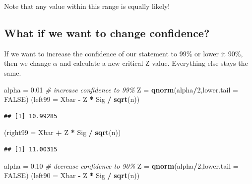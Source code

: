 \documentclass[
]{book}
\newenvironment{Shaded}{\begin{snugshade}}{\end{snugshade}}
\newcommand{\AttributeTok}[1]{\textcolor[rgb]{0.13,0.29,0.53}{#1}}
\newcommand{\CommentTok}[1]{\textcolor[rgb]{0.56,0.35,0.01}{\textit{#1}}}
\newcommand{\ConstantTok}[1]{\textcolor[rgb]{0.56,0.35,0.01}{#1}}
\newcommand{\DecValTok}[1]{\textcolor[rgb]{0.00,0.00,0.81}{#1}}
\newcommand{\FloatTok}[1]{\textcolor[rgb]{0.00,0.00,0.81}{#1}}
\newcommand{\FunctionTok}[1]{\textcolor[rgb]{0.13,0.29,0.53}{\textbf{#1}}}
\newcommand{\NormalTok}[1]{#1}
\newcommand{\OtherTok}[1]{\textcolor[rgb]{0.56,0.35,0.01}{#1}}
\newcommand{\SpecialCharTok}[1]{\textcolor[rgb]{0.81,0.36,0.00}{\textbf{#1}}}
\begin{document}
Note that any value within this range is equally likely!

\subsection{What if we want to change confidence?}\label{what-if-we-want-to-change-confidence}

If we want to increase the confidence of our statement to 99\% or lower it 90\%, then we change \(\alpha\) and calculate a new critical Z value. Everything else stays the same.

\begin{Shaded}
\begin{Highlighting}[]
\NormalTok{alpha }\OtherTok{=} \FloatTok{0.01} \CommentTok{\# increase confidence to 99\%}
\NormalTok{Z }\OtherTok{=} \FunctionTok{qnorm}\NormalTok{(alpha}\SpecialCharTok{/}\DecValTok{2}\NormalTok{,}\AttributeTok{lower.tail =} \ConstantTok{FALSE}\NormalTok{)}
\NormalTok{(}\AttributeTok{left99 =}\NormalTok{ Xbar }\SpecialCharTok{{-}}\NormalTok{ Z }\SpecialCharTok{*}\NormalTok{ Sig }\SpecialCharTok{/} \FunctionTok{sqrt}\NormalTok{(n))}
\end{Highlighting}
\end{Shaded}

\begin{verbatim}
## [1] 10.99285
\end{verbatim}

\begin{Shaded}
\begin{Highlighting}[]
\NormalTok{(}\AttributeTok{right99 =}\NormalTok{ Xbar }\SpecialCharTok{+}\NormalTok{ Z }\SpecialCharTok{*}\NormalTok{ Sig }\SpecialCharTok{/} \FunctionTok{sqrt}\NormalTok{(n))}
\end{Highlighting}
\end{Shaded}

\begin{verbatim}
## [1] 11.00315
\end{verbatim}

\begin{Shaded}
\begin{Highlighting}[]
\NormalTok{alpha }\OtherTok{=} \FloatTok{0.10} \CommentTok{\# decrease confidence to 90\%}
\NormalTok{Z }\OtherTok{=} \FunctionTok{qnorm}\NormalTok{(alpha}\SpecialCharTok{/}\DecValTok{2}\NormalTok{,}\AttributeTok{lower.tail =} \ConstantTok{FALSE}\NormalTok{)}
\NormalTok{(}\AttributeTok{left90 =}\NormalTok{ Xbar }\SpecialCharTok{{-}}\NormalTok{ Z }\SpecialCharTok{*}\NormalTok{ Sig }\SpecialCharTok{/} \FunctionTok{sqrt}\NormalTok{(n))}
\end{Highlighting}
\end{Shaded}
\end{document}
